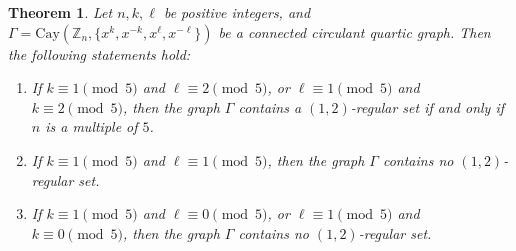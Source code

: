 \documentclass[12pt]{article}
\newtheorem{thmA}[propA]{Theorem}
\begin{document}
\begin{thmA}\label{thm:12}
	Let $n, k, \ell$ be positive integers, and $\Gamma = \mathrm{Cay}(\mathbb{Z}_n, \{x^k, x^{-k}, x^\ell, x^{-\ell}\})$ be a connected circulant quartic graph. Then the following statements hold:
	\begin{enumerate}
		\item[(i)] If \(k\equiv 1 \pmod{5}\) and \(\ell\equiv 2 \pmod{5}\), or \(\ell\equiv 1 \pmod{5}\) and \(k\equiv 2 \pmod{5}\), then the graph \(\Gamma\) contains a \((1,2)\)-regular set if and only if $n$ is a multiple of $5$.
		\item[(ii)] If \(k \equiv 1 \pmod{5}\) and \(\ell \equiv 1 \pmod{5}\), then the graph \(\Gamma\) contains no \((1,2)\)-regular set.
		\item[(iii)] If \(k\equiv 1 \pmod{5}\) and \(\ell\equiv 0 \pmod{5}\), or \(\ell\equiv 1 \pmod{5}\) and \(k\equiv 0 \pmod{5}\), then the graph \(\Gamma\) contains no \((1,2)\)-regular set.
	\end{enumerate}
\end{thmA}
\end{document}
